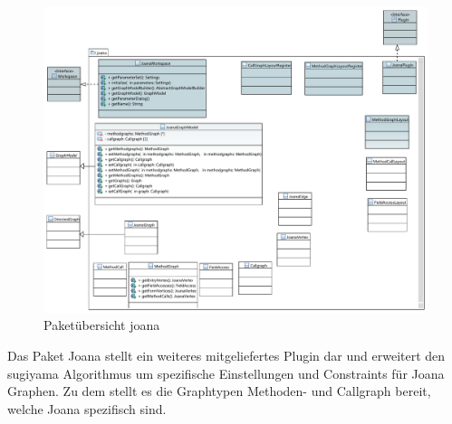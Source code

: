 \begin{figure}[hb]
  \centering
  \includegraphics[width=380pt]{resourcen/joana.pdf}
  \caption{Paketübersicht joana}
  \label{fig:packge_joana}
\end{figure}

Das Paket Joana stellt ein weiteres mitgeliefertes Plugin dar und erweitert den sugiyama Algorithmus um spezifische Einstellungen und Constraints für Joana Graphen. Zu dem stellt es die Graphtypen Methoden- und Callgraph bereit, welche Joana spezifisch sind.